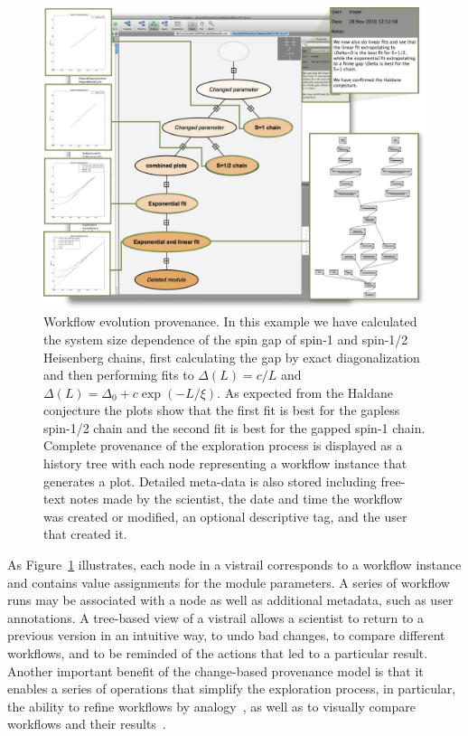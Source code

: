 \documentclass[12pt]{iopart}
\begin{document}
\begin{figure}[t]
\centering
\begin{center}
  \includegraphics[width = 1.0\linewidth,clip=false]{figures/alps_tree.png}
  \caption{Workflow evolution provenance.  
    In this example we have calculated the system size dependence of the spin gap of spin-1 and spin-1/2 Heisenberg chains, first calculating the gap by exact diagonalization and then performing fits to $\Delta(L)=  c/L$ and  $\Delta(L)=  \Delta_0 + c \exp(-L/\xi)$. As expected from the Haldane conjecture the plots show that the first fit is best for the gapless spin-1/2 chain and the second fit is best for the gapped spin-1 chain.
    Complete provenance of the exploration process is
    displayed as a history tree with each node representing a workflow
    instance that generates a plot. Detailed meta-data is
    also stored including free-text notes made by the scientist, the
    date and time the workflow was created or modified, an optional
    descriptive tag, and the user that created it.} \label{fig:alps-tree}
  \vspace{-.3cm}
\end{center}
\end{figure}

As Figure~\ref{fig:alps-tree} illustrates, each node in a vistrail
corresponds to a workflow instance and contains value assignments for
the module parameters. A series of workflow runs may be associated
with a node as well as additional metadata, such as user annotations.
A tree-based view of a vistrail allows a scientist to return to a
previous version in an intuitive way, to undo bad changes, to compare
different workflows, and to be reminded of the actions that led to a
particular result.  Another important benefit of the change-based
provenance model is that it enables a series of operations that
simplify the exploration process, in particular, the ability to refine
workflows by analogy~\cite{analogies@tvcg2007}, as well as to visually
compare workflows and their results~\cite{Freire:2006:IPAW}.
\end{document}
